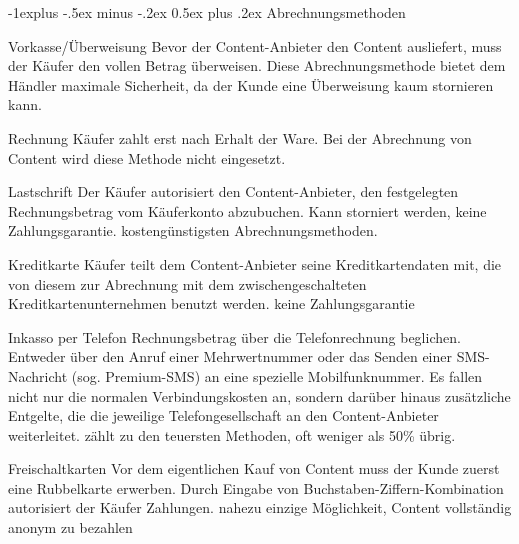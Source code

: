 \documentclass[a4paper]{article}
\makeatletter
\renewcommand{\subsection}{\@startsection{subsection}{2}{0mm}%
                                {-1explus -.5ex minus -.2ex}%
                                {0.5ex plus .2ex}%
                                {\normalfont\normalsize\bfseries}}
\makeatother
\begin{document}
\begin{multicols*}{2}
  \subsection{Abrechnungsmethoden}
  \begin{description*}
    \item[Vorkasse/Überweisung] Bevor der Content-Anbieter den Content ausliefert, muss der Käufer den vollen Betrag überweisen. Diese Abrechnungsmethode bietet dem Händler maximale Sicherheit, da der Kunde eine Überweisung kaum stornieren kann.
    \item[Rechnung] Käufer zahlt erst nach Erhalt der Ware. Bei der Abrechnung von Content wird diese Methode nicht eingesetzt.
    \item[Lastschrift] Der Käufer autorisiert den Content-Anbieter, den festgelegten Rechnungsbetrag vom Käuferkonto abzubuchen. Kann storniert werden, keine Zahlungsgarantie. kostengünstigsten Abrechnungsmethoden.
    \item[Kreditkarte] Käufer teilt dem Content-Anbieter seine Kreditkartendaten mit, die von diesem zur Abrechnung mit dem zwischengeschalteten Kreditkartenunternehmen benutzt werden. keine Zahlungsgarantie
    \item[Inkasso per Telefon] Rechnungsbetrag über die Telefonrechnung beglichen. Entweder über den Anruf einer Mehrwertnummer oder das Senden einer SMS-Nachricht (sog. Premium-SMS) an eine spezielle Mobilfunknummer. Es fallen nicht nur die normalen Verbindungskosten an, sondern darüber hinaus zusätzliche Entgelte, die die jeweilige Telefongesellschaft an den Content-Anbieter weiterleitet. zählt zu den teuersten Methoden, oft weniger als 50\% übrig.
    \item[Freischaltkarten] Vor dem eigentlichen Kauf von Content muss der Kunde zuerst eine Rubbelkarte erwerben. Durch Eingabe von Buchstaben-Ziffern-Kombination autorisiert der Käufer Zahlungen. nahezu einzige Möglichkeit, Content vollständig anonym zu bezahlen
  \end{description*}


\end{multicols*}
\end{document}

